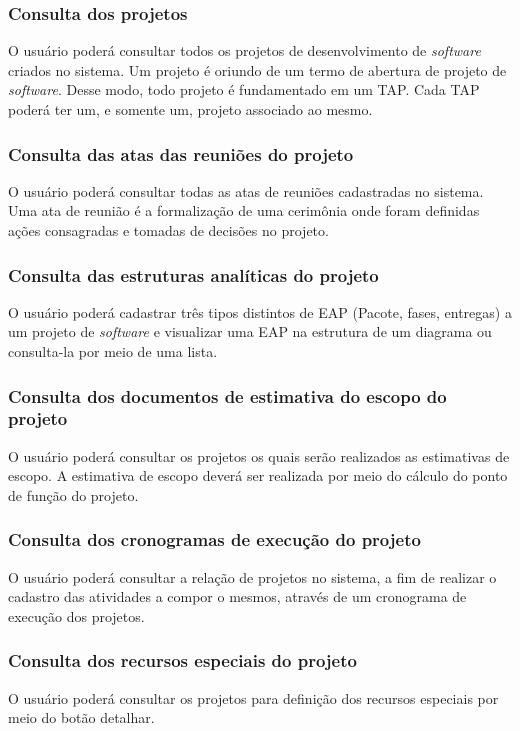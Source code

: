 \documentclass{acm_proc_article-sp}
\begin{document}
\subsubsection{Consulta dos projetos}
O usuário poderá consultar todos os projetos de desenvolvimento de \textit{software} criados no sistema. Um projeto é oriundo de um termo de abertura de projeto de \textit{software}. Desse modo, todo projeto é fundamentado em um TAP. Cada TAP poderá ter um, e somente um, projeto associado ao mesmo.

\subsubsection{Consulta das atas das reuniões do projeto}
O usuário poderá consultar todas as atas de reuniões cadastradas no sistema. Uma ata de reunião é a formalização de uma cerimônia onde foram definidas ações consagradas e tomadas de decisões no projeto.

\subsubsection{Consulta das estruturas analíticas do projeto}
O usuário poderá cadastrar três tipos distintos de EAP (Pacote, fases, entregas) a um projeto de \textit{software} e visualizar uma EAP na estrutura de um diagrama ou consulta-la por meio de uma lista. 

\subsubsection{Consulta dos documentos de estimativa do escopo do projeto}
O usuário poderá consultar os projetos os quais serão realizados as estimativas de escopo. A estimativa de escopo deverá ser realizada por meio do cálculo do ponto de função do projeto.

\subsubsection{Consulta dos cronogramas de execução do projeto}
O usuário poderá consultar a relação de projetos no sistema, a fim de realizar o cadastro das atividades a compor o mesmos, através de um cronograma de execução dos projetos.

\subsubsection{Consulta dos recursos especiais do projeto}
O usuário poderá consultar os projetos para definição dos recursos especiais por meio do botão detalhar.
\end{document}
